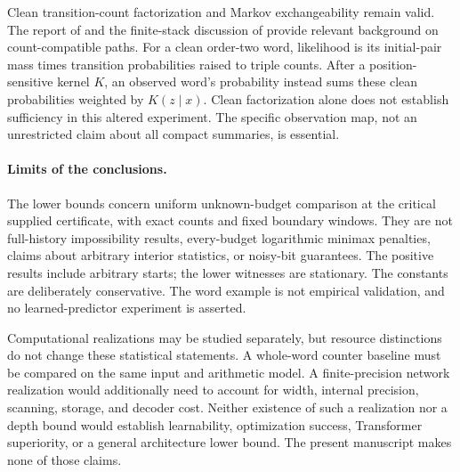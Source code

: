 \documentclass[11pt,letterpaper]{article}
\theoremstyle{definition}
\theoremstyle{remark}
\numberwithin{equation}{section}
\begin{document}
Clean transition-count factorization and Markov exchangeability remain valid. The report of \citet{DiaconisFreedman1978} and the finite-stack discussion of \citet{HalberstamHutchcroft2024} provide relevant background on count-compatible paths. For a clean order-two word, likelihood is its initial-pair mass times transition probabilities raised to triple counts. After a position-sensitive kernel $K$, an observed word's probability instead sums these clean probabilities weighted by $K(z\mid x)$. Clean factorization alone does not establish sufficiency in this altered experiment. The specific observation map, not an unrestricted claim about all compact summaries, is essential.

\paragraph{Limits of the conclusions.}
The lower bounds concern uniform unknown-budget comparison at the critical supplied certificate, with exact counts and fixed boundary windows. They are not full-history impossibility results, every-budget logarithmic minimax penalties, claims about arbitrary interior statistics, or noisy-bit guarantees. The positive results include arbitrary starts; the lower witnesses are stationary. The constants are deliberately conservative. The word example is not empirical validation, and no learned-predictor experiment is asserted.

Computational realizations may be studied separately, but resource distinctions do not change these statistical statements. A whole-word counter baseline must be compared on the same input and arithmetic model. A finite-precision network realization would additionally need to account for width, internal precision, scanning, storage, and decoder cost. Neither existence of such a realization nor a depth bound would establish learnability, optimization success, Transformer superiority, or a general architecture lower bound. The present manuscript makes none of those claims.

\clearpage
\appendix



\clearpage


\end{document}
